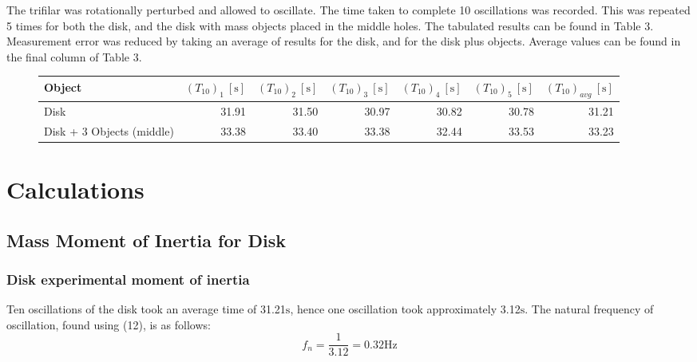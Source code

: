 \documentclass[a4paper]{article}
\begin{document}
The trifilar was rotationally perturbed and allowed to oscillate. The time taken to complete 10 oscillations was recorded. This was repeated 5 times for both the disk, and the disk with mass objects placed in the middle holes. The tabulated results can be found in Table 3. Measurement error was reduced by taking an average of results for the disk, and for the disk plus objects. Average values can be found in the final column of Table 3. 

\vspace{0.5cm}

\begin{figure}[h]
	\centering
	\small
	\begin{tabular}{lrrrrrr}
		\toprule
		Object & $(T_{10})_1 \ [\si{\second}]$ & $(T_{10})_2 \ [\si{\second}]$ & $(T_{10})_3 \ [\si{\second}]$ & $(T_{10})_4 \ [\si{\second}]$ & $(T_{10})_5 \ [\si{\second}]$ & $(T_{10})_{avg} \ [\si{\second}]$ \\
		\midrule
		Disk & 31.91 & 31.50 & 30.97 & 30.82 & 30.78 & 31.21\\
		Disk + 3 Objects (middle) & 33.38 & 33.40 & 33.38 & 32.44 & 33.53 & 33.23 \\
		\bottomrule
	\end{tabular}
\end{figure}


\newpage

\section{Calculations}
\subsection{Mass Moment of Inertia for Disk}
\subsubsection{Disk experimental moment of inertia}
Ten oscillations of the disk took an average time of 31.21$\si{\second}$, hence one oscillation took approximately 3.12$\si{\second}$. The natural frequency of oscillation, found using (12), is as follows:
\begin{equation}
f_n = \frac{1}{3.12} = 0.32\si{\hertz}
\end{equation}
\end{document}
